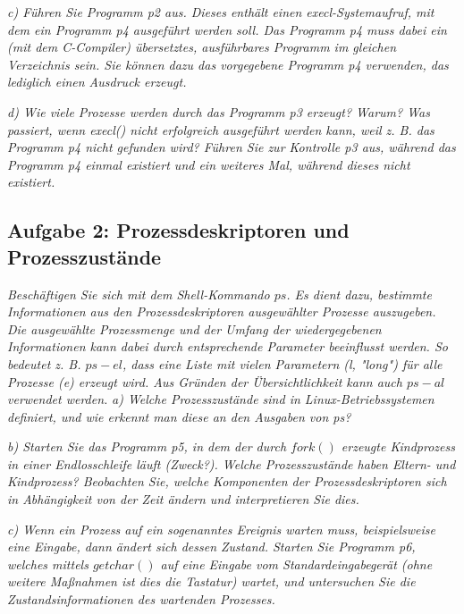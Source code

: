 \documentclass[a4paper]{article}
\begin{document}
\textit{c) Führen Sie Programm p2 aus. Dieses enthält einen execl-Systemaufruf, mit dem ein Programm p4 ausgeführt werden soll. Das Programm p4 muss dabei ein (mit dem C-Compiler) übersetztes, ausführbares Programm im gleichen Verzeichnis sein. Sie können dazu das vorgegebene Programm p4 verwenden, das lediglich einen Ausdruck erzeugt.}
\vspace{10mm}


\textit{d) Wie viele Prozesse werden durch das Programm p3 erzeugt? Warum? Was passiert, wenn execl() nicht erfolgreich ausgeführt werden kann, weil z. B. das Programm p4 nicht gefunden wird? Führen Sie zur Kontrolle p3 aus, während das Programm p4 einmal existiert und ein weiteres Mal, während dieses nicht existiert.}
\vspace{10mm}


\subsection{Aufgabe 2: Prozessdeskriptoren und Prozesszustände}
\textit{Beschäftigen Sie sich mit dem Shell-Kommando $ps$. Es dient dazu, bestimmte Informationen aus den Prozessdeskriptoren ausgewählter Prozesse auszugeben. Die ausgewählte Prozessmenge und der Umfang der wiedergegebenen Informationen kann dabei durch entsprechende Parameter beeinflusst werden. So bedeutet z. B. $ps -el$, dass eine Liste mit vielen Parametern (l, "long") für alle Prozesse (e) erzeugt wird. Aus Gründen der Übersichtlichkeit kann auch $ps -al$ verwendet werden.}
\vspace{10mm}
\textit{a) Welche Prozesszustände sind in Linux-Betriebssystemen definiert, und wie erkennt man diese an den Ausgaben von ps?}
\vspace{10mm}


\textit{b) Starten Sie das Programm p5, in dem der durch $fork()$ erzeugte Kindprozess in einer Endlosschleife läuft (Zweck?). Welche Prozesszustände haben Eltern- und Kindprozess? Beobachten Sie, welche Komponenten der Prozessdeskriptoren sich in Abhängigkeit von der Zeit ändern und interpretieren Sie dies.}
\vspace{10mm}


\textit{c) Wenn ein Prozess auf ein sogenanntes Ereignis warten muss, beispielsweise eine Eingabe, dann ändert sich dessen Zustand. Starten Sie Programm p6, welches mittels $getchar()$ auf eine Eingabe vom Standardeingabegerät (ohne weitere Maßnahmen ist dies die Tastatur) wartet, und untersuchen Sie die Zustandsinformationen des wartenden Prozesses.}
\vspace{10mm}
\end{document}
